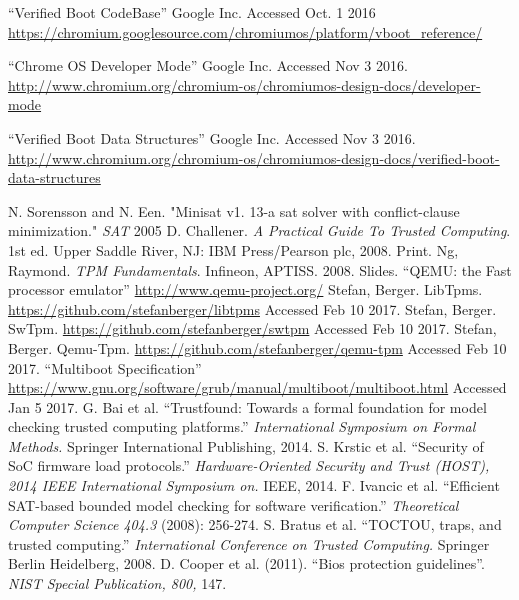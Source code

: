 \documentclass[12pt,lot, lof]{puthesis}
\begin{document}
\begin{flushleft}
\begin{footnotesize}
\begin{thebibliography}{\kern\bibindent}
    ``Verified Boot CodeBase'' Google Inc. Accessed Oct. 1 2016 \url{https://chromium.googlesource.com/chromiumos/platform/vboot\_reference/}

    ``Chrome OS Developer Mode'' Google Inc. Accessed Nov 3 2016. \url{http://www.chromium.org/chromium-os/chromiumos-design-docs/developer-mode}

    ``Verified Boot Data Structures'' Google Inc. Accessed Nov 3 2016. \url{http://www.chromium.org/chromium-os/chromiumos-design-docs/verified-boot-data-structures}

    N. Sorensson and N. Een. "Minisat v1. 13-a sat solver with conflict-clause minimization." \textit{SAT} 2005 
    D. Challener. \textit{A Practical Guide To Trusted Computing}. 1st ed. Upper Saddle River, NJ: IBM Press/Pearson plc, 2008. Print.
    Ng, Raymond. \textit{TPM Fundamentals}. Infineon, APTISS. 2008. Slides.
    ``QEMU: the Fast processor emulator'' \url{http://www.qemu-project.org/}
    Stefan, Berger. LibTpms. \url{https://github.com/stefanberger/libtpms} Accessed Feb 10 2017.
    Stefan, Berger. SwTpm. \url{https://github.com/stefanberger/swtpm} Accessed Feb 10 2017.
    Stefan, Berger. Qemu-Tpm. \url{https://github.com/stefanberger/qemu-tpm} Accessed Feb 10 2017.
    ``Multiboot Specification'' \url{https://www.gnu.org/software/grub/manual/multiboot/multiboot.html} Accessed Jan 5 2017.  
    G. Bai et al. ``Trustfound: Towards a formal foundation for model checking trusted computing platforms.'' \textit{International Symposium on Formal Methods.} Springer International Publishing, 2014.
    S. Krstic et al. ``Security of SoC firmware load protocols.''
    \textit{Hardware-Oriented Security and Trust (HOST), 2014 IEEE International Symposium on.} IEEE, 2014.
    F. Ivancic et al. ``Efficient SAT-based bounded model checking for software verification.'' \textit{Theoretical Computer Science 404.3} (2008): 256-274.
    S. Bratus et al. ``TOCTOU, traps, and trusted computing.'' \textit{International Conference on Trusted Computing.} Springer Berlin Heidelberg, 2008.
    D. Cooper et al. (2011). ``Bios protection guidelines''. \textit{NIST Special Publication, 800,} 147.

\end{thebibliography}
\end{footnotesize}
\end{flushleft}
\end{document}
